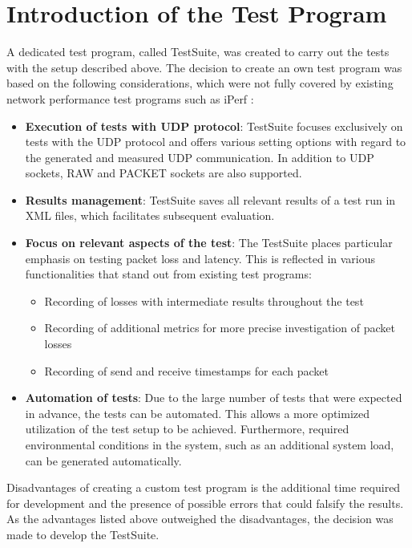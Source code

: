 \section{Introduction of the Test Program} \label{chap:TestSuite}
A dedicated test program, called TestSuite, was created to carry out the tests with the setup described above. The decision to create an own test program was based on the following considerations, which were not fully covered by existing network performance test programs such as iPerf \cite{testsuite01}:

\begin{itemize}
\item \textbf{Execution of tests with UDP protocol}: TestSuite focuses exclusively on tests with the UDP protocol and offers various setting options with regard to the generated and measured UDP communication. In addition to UDP sockets, RAW and PACKET sockets are also supported.
\item \textbf{Results management}: TestSuite saves all relevant results of a test run in XML files, which facilitates subsequent evaluation.
\item \textbf{Focus on relevant aspects of the test}: The TestSuite places particular emphasis on testing packet loss and latency. This is reflected in various functionalities that stand out from existing test programs:

	\begin{itemize}
      \item Recording of losses with intermediate results throughout the test
      \item Recording of additional metrics for more precise investigation of packet losses
      \item Recording of send and receive timestamps for each packet
    \end{itemize}

\item \textbf{Automation of tests}: Due to the large number of tests that were expected in advance, the tests can be automated. This allows a more optimized utilization of the test setup to be achieved. Furthermore, required environmental conditions in the system, such as an additional system load, can be generated automatically.
\end{itemize}

Disadvantages of creating a custom test program is the additional time required for development and the presence of possible errors that could falsify the results. As the advantages listed above outweighed the disadvantages, the decision was made to develop the TestSuite.

